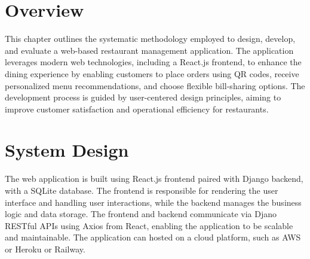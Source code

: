 \section{Overview}
This chapter outlines the systematic methodology employed to design, develop, and evaluate a web-based restaurant management application. The application leverages modern web technologies, including a React.js frontend, to enhance the dining experience by enabling customers to place orders using QR codes, receive personalized menu recommendations, and choose flexible bill-sharing options. The development process is guided by user-centered design principles, aiming to improve customer satisfaction and operational efficiency for restaurants.

\section{System Design}
The web application is built using React.js frontend paired with Django backend, with a SQLite database. The frontend is responsible for rendering the user interface and handling user interactions, while the backend manages the business logic and data storage. The frontend and backend communicate via Djano RESTful APIs using Axios from React, enabling the application to be scalable and maintainable. The application can hosted on a cloud platform, such as AWS or Heroku or Railway.

